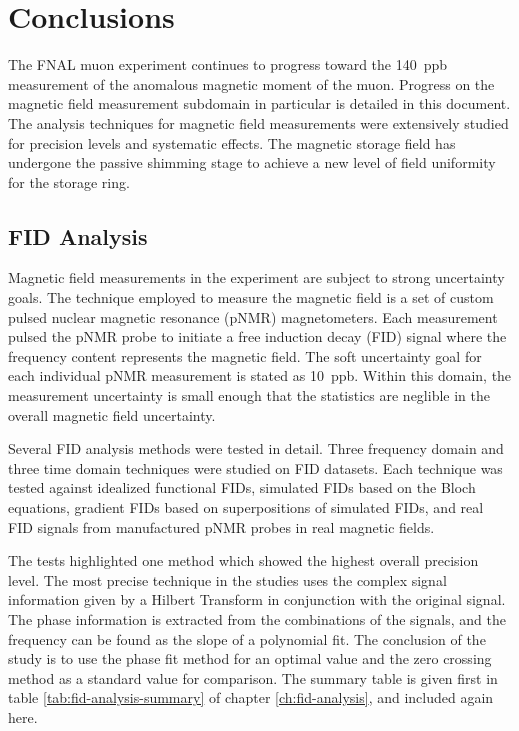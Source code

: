 \chapter{Conclusions}

The FNAL muon \gmtwo experiment continues to progress toward the \SI{140}{ppb} measurement of the anomalous magnetic moment of the muon.  Progress on the magnetic field measurement subdomain in particular is detailed in this document.  The analysis techniques for magnetic field measurements were extensively studied for precision levels and systematic effects.  The magnetic storage field has undergone the passive shimming stage to achieve a new level of field uniformity for the \gmtwo storage ring.

\section{FID Analysis}

Magnetic field measurements in the \mugmtwo experiment are subject to strong uncertainty goals.  The technique employed to measure the magnetic field is a set of custom pulsed nuclear magnetic resonance (pNMR) magnetometers.  Each measurement pulsed the pNMR probe to initiate a free induction decay (FID) signal where the frequency content represents the magnetic field.  The soft uncertainty goal for each individual pNMR measurement is stated as \SI{10}{ppb}.  Within this domain, the measurement uncertainty is small enough that the statistics are neglible in the overall magnetic field uncertainty.

Several FID analysis methods were tested in detail.  Three frequency domain and three time domain techniques were studied on FID datasets.  Each technique was tested against idealized functional FIDs, simulated FIDs based on the Bloch equations, gradient FIDs based on superpositions of simulated FIDs, and real FID signals from manufactured pNMR probes in real magnetic fields.  

The tests highlighted one method which showed the highest overall precision level.  The most precise technique in the studies uses the complex signal information given by a Hilbert Transform in conjunction with the original signal.  The phase information is extracted from the combinations of the signals, and the frequency can be found as the slope of a polynomial fit.  The conclusion of the study is to use the phase fit method for an optimal value and the zero crossing method as a standard value for comparison.  The summary table is given first in table \ref{tab:fid-analysis-summary} of chapter \ref{ch:fid-analysis}, and included again here.

